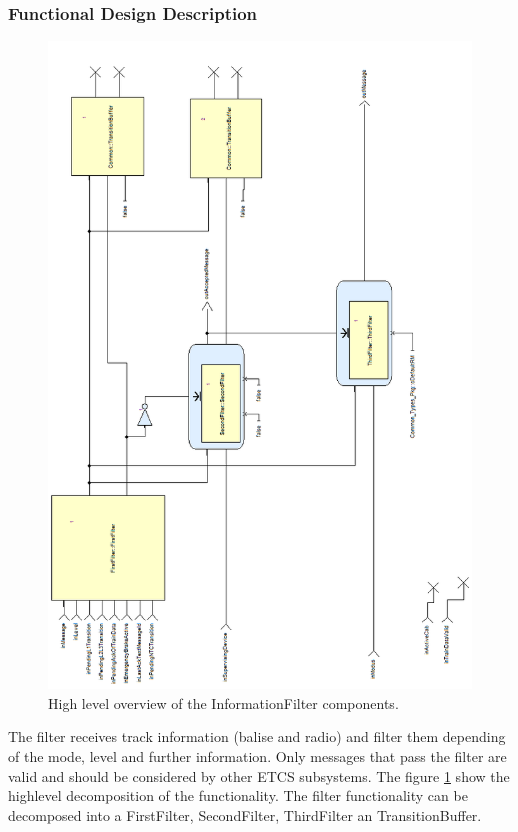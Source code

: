 \subsubsection{Functional Design Description}

\begin{figure}
\centering
\includegraphics [width=\textwidth]{images/informationfilter-high-level-rot.png}
\caption{High level overview of the InformationFilter components.}
\label{fig:InformationFilterHighLevel}
\end{figure}

The filter receives track information (balise and radio) and filter
them depending of the mode, level and further information. Only
messages that pass the filter are valid and should be considered by
other ETCS subsystems. The figure \ref{fig:InformationFilterHighLevel}
show the high\-level decomposition of the functionality. The filter
functionality can be decomposed into a FirstFilter, SecondFilter,
ThirdFilter an TransitionBuffer.


